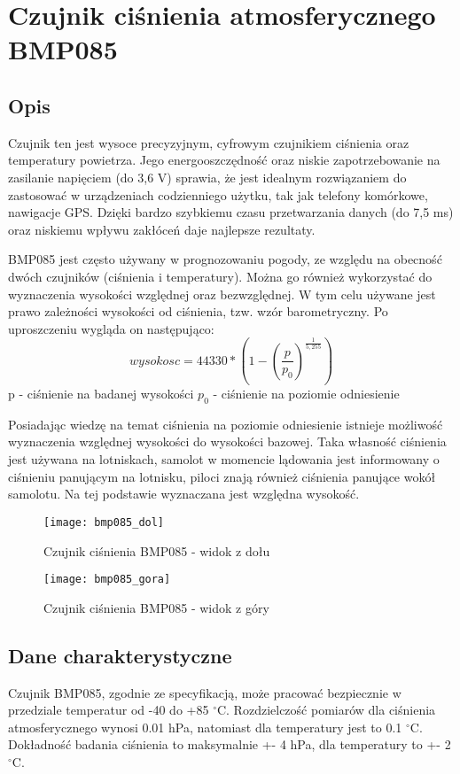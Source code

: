 \chapter{Czujnik ciśnienia atmosferycznego BMP085}
\section*{Opis}
Czujnik ten jest wysoce precyzyjnym, cyfrowym czujnikiem ciśnienia oraz temperatury powietrza. Jego energooszczędność oraz niskie zapotrzebowanie na zasilanie napięciem (do 3,6 V) sprawia, że jest idealnym rozwiązaniem do zastosować w urządzeniach codzienniego użytku, tak jak telefony komórkowe, nawigacje GPS. Dzięki bardzo szybkiemu czasu przetwarzania danych (do 7,5 ms) oraz niskiemu wpływu zakłóceń daje najlepsze rezultaty.


BMP085 jest często używany w prognozowaniu pogody, ze względu na obecność dwóch czujników (ciśnienia i temperatury). Można go również wykorzystać do wyznaczenia wysokości względnej oraz bezwzględnej. W tym celu używane jest prawo zależności wysokości od ciśnienia, tzw. wzór barometryczny. Po uproszczeniu wygląda on następująco:
$$ wysokosc = 44330 * (1- (\frac{p}{p_{0}})^{\frac{1}{5,255}}) $$
p - ciśnienie na badanej wysokości\newline
$ p_{0} $ - ciśnienie na poziomie odniesienie
\newline

Posiadając wiedzę na temat ciśnienia na poziomie odniesienie istnieje możliwość wyznaczenia względnej wysokości do wysokości bazowej. Taka własność ciśnienia jest używana na lotniskach, samolot w momencie lądowania jest informowany o ciśnieniu panującym na lotnisku, piloci znają również ciśnienia panujące wokół samolotu. Na tej podstawie wyznaczana jest względna wysokość.
\begin{figure}[h]
\centering
\texttt{[image: bmp085\_dol]}
\caption{Czujnik ciśnienia BMP085 - widok z dołu}
\label{fig:bmp085_dol}
\end{figure}
\begin{figure}[h]
\centering
\texttt{[image: bmp085\_gora]}
\caption{Czujnik ciśnienia BMP085 - widok z góry}
\label{fig:bmp085_gora}
\end{figure}

\section*{Dane charakterystyczne}
Czujnik BMP085, zgodnie ze specyfikacją, może pracować bezpiecznie w przedziale temperatur od -40 do +85 $^\circ$C. Rozdzielczość pomiarów dla ciśnienia atmosferycznego wynosi 0.01 hPa, natomiast dla temperatury jest to 0.1 $^\circ$C. Dokładność badania ciśnienia to maksymalnie +- 4 hPa, dla temperatury to +- 2$^\circ$C.

